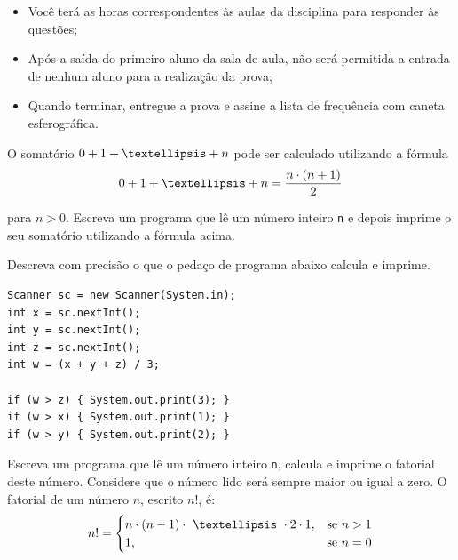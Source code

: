 \documentclass[addpoints, a4paper]{exam}
\begin{document}
{{{\begin{itemize}
			\item Você terá as horas correspondentes às aulas da disciplina para responder às questões;
			      
			\item Após a saída do primeiro aluno da sala de aula, não será permitida a entrada de nenhum aluno para a realização da prova;
			      
			\item Quando terminar, entregue a prova e assine a lista de frequência com caneta esferográfica.
		\end{itemize}
	}}
	
	\vspace{5mm}
	
	\begin{questions}
		
		\setlength{\columnsep}{30pt}
		\begin{multicols}{2}
			\question[2] O somatório $0 + 1 + \textellipsis + n$ pode ser calculado utilizando a fórmula
			\begin{equation*} \label{sum}
				0 + 1 + \textellipsis + n = \frac{n \cdot (n + 1)}{2}
			\end{equation*}
			
			para $n > 0$. Escreva um programa que lê um número inteiro \texttt{n} e depois imprime o seu somatório utilizando a fórmula acima.
			
			\question[2] Descreva com precisão o que o pedaço de programa abaixo calcula e imprime.
			
			\begin{verbatim}
Scanner sc = new Scanner(System.in);
int x = sc.nextInt();
int y = sc.nextInt();
int z = sc.nextInt();
int w = (x + y + z) / 3;

if (w > z) { System.out.print(3); }
if (w > x) { System.out.print(1); }
if (w > y) { System.out.print(2); }
			\end{verbatim}
			
			\question[2] Escreva um programa que lê um número inteiro \texttt{n}, calcula e imprime o fatorial deste número. Considere que o número lido será sempre maior ou igual a zero. O fatorial de um número $n$, escrito $n!$, é:
			\[
				n! = 
				\begin{cases}
					n \cdot (n - 1) \cdot~\textellipsis~\cdot 2 \cdot 1, & \text{se } n > 1 \\
					1,                                                                 & \text{se } n = 0 
				\end{cases}
			\]
			

\end{multicols}
\end{questions}}
\end{document}
